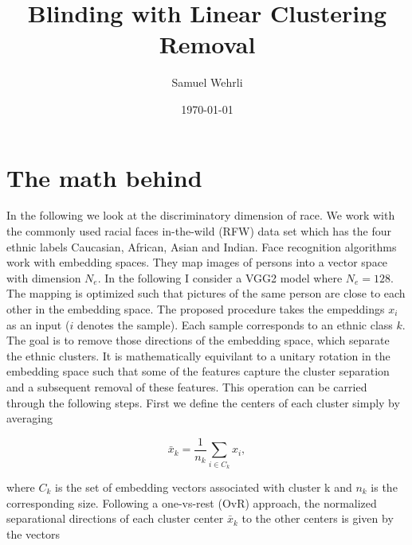 \documentclass[12pt]{article}
\begin{document}
\title{Blinding with Linear Clustering Removal}
\author{Samuel Wehrli}
\date{\today}
\maketitle


\section{The math behind}

In the following we look at the discriminatory dimension of race. We work with the commonly used racial faces in-the-wild (RFW) data set which has the four ethnic labels Caucasian, African, Asian and Indian. Face recognition algorithms work with embedding spaces. They map images of persons into a vector space with dimension $N_e$. In the following I consider a VGG2 model where $N_e=128$. The mapping is optimized such that pictures of the same person are close to each other in the embedding space. The proposed procedure takes the empeddings $x_i$ as an input ($i$ denotes the sample). Each sample corresponds to an ethnic class $k$. The goal is to remove those directions of the embedding space, which separate the ethnic clusters. It is mathematically equivilant to a unitary rotation in the embedding space such that some of the features capture the cluster separation and a subsequent removal of these features. This operation can be carried through the following steps. First we define the centers of each cluster simply by averaging

\begin{equation}
\label{eq:xbar}
	\bar{x}_k = \frac{1}{n_k}\sum_{i\in C_k} x_i ,
\end{equation} 

\noindent where $C_k$ is the set of embedding vectors associated with cluster k and $n_k$ is the corresponding size. Following a one-vs-rest (OvR) approach, the normalized separational directions of each cluster center $\bar{x}_k$ to the other centers is given by the vectors
\end{document}
